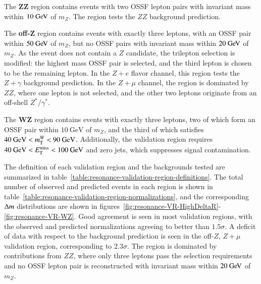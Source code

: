 The $\mathbf{ZZ}$ region contains events with two OSSF lepton pairs with invariant mass within $10 \GeV$ of $m_Z$. The region tests the $ZZ$ background prediction.

The \textbf{off-}$\mathbf{Z}$ region contains events with exactly three leptons, with an OSSF pair within $50 \GeV$ of $m_Z$, but no OSSF pairs with invariant mass within $20 \GeV$ of $m_Z$. As the event does not contain a $Z$ candidate, the trilepton selection is modified: the highest mass OSSF pair is selected, and the third lepton is chosen to be the remaining lepton. In the $Z+e$ flavor channel, this region tests the $Z+\gamma$ background prediction. In the $Z+\mu$ channel, the region is dominated by $ZZ$, where one lepton is not selected, and the other two leptons originate from an off-shell $Z^{*}/\gamma^{*}$. 

The $\mathbf{WZ}$ region contains events with exactly three leptons, two of which form an OSSF pair within $10~\mbox{GeV}$ of $m_Z$, and the third of which satisfies $40~\mbox{GeV}<m_{\mathrm{T}}^W<90~\mbox{GeV}$. Additionally, the validation region requires $40~\mbox{GeV}<E_{\text{T}}^{\text{miss}}<100~\mbox{GeV}$ and zero jets, which suppresses signal contamination.

The definition of each validation region and the backgrounds tested are summarized in table~\ref{table:resonance-validation-region-definitions}. The total number of observed and predicted events in each region is shown in table~\ref{table:resonance-validation-region-normalizations}, and the corresponding $\Delta m$ distributions are shown in figures~\ref{fig:resonance-VR-HighDeltaR}-\ref{fig:resonance-VR-WZ}. Good agreement is seen in most validation regions, with the observed and predicted normalizations agreeing to better than $1.5\sigma$. A deficit of data with respect to the background prediction is seen in the off-$Z$, $Z+\mu$ validation region, corresponding to $2.3\sigma$. The region is dominated by contributions from $ZZ$, where only three leptons pass the selection requirements and no OSSF lepton pair is reconstructed with invariant mass within $20 \GeV$ of $m_Z$. 


